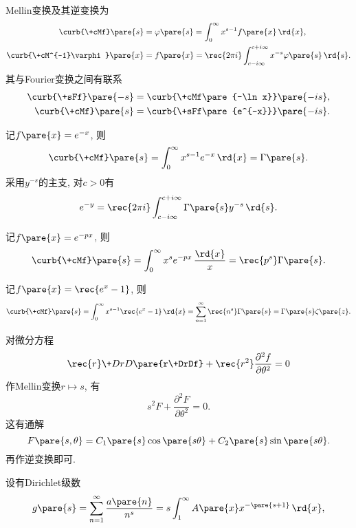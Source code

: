 \documentclass[../ComplexVariable.tex]{subfiles}
\begin{document}
Mellin变换及其逆变换为
\begin{align*}
    \curb{\+cMf}\pare{s} &= \varphi\pare{s} = \int_0^\infty x^{s-1}f\pare{x}\,\rd{x},\\ \curb{\+cM^{-1}\varphi}\pare{x} &= f\pare{x} = \rec{2\pi i} \int_{c-i\infty}^{c+i\infty} x^{-s}\varphi\pare{s}\,\rd{s}.
\end{align*}
其与Fourier变换之间有联系
\begin{align*}
    \curb{\+sFf}\pare{-s} &= \curb{\+cMf\pare{-\ln x}}\pare{-is}, \\
    \curb{\+cMf}\pare{s} &= \curb{\+sFf\pare{e^{-x}}}\pare{-is}.
\end{align*}
\begin{sample}
    \begin{ex}
        记$f\pare{x} = e^{-x}$, 则
        \[ \curb{\+cMf}\pare{s} = \int_0^\infty x^{s-1}e^{-x}\,\rd{x} = \Gamma\pare{s}. \]
        采用$y^{-s}$的主支, 对$c>0$有
        \[ e^{-y} = \rec{2\pi i} \int_{c-i\infty}^{c+i\infty}\Gamma\pare{s}y^{-s}\,\rd{s}. \]
    \end{ex}
\end{sample}
\begin{sample}
    \begin{ex}
        记$f\pare{x} = e^{-px}$, 则
        \[ \curb{\+cMf}\pare{s} = \int_0^\infty x^se^{-px}\,\frac{\rd{x}}{x} = \rec{p^s}\Gamma\pare{s}. \]
    \end{ex}
\end{sample}
\begin{sample}
    \begin{ex}
        记$\displaystyle f\pare{x} = \rec{e^x-1}$, 则
        \[ \curb{\+cMf}\pare{s} = \int_0^\infty x^{s-1}\rec{e^x-1}\,\rd{x} = \sum_{n=1}^\infty \rec{n^s}\Gamma\pare{s} = \Gamma\pare{s}\zeta\pare{z}. \]
    \end{ex}
\end{sample}
\begin{sample}
    \begin{ex}
        对微分方程
        \[ \rec{r}\+DrD{}\pare{r\+DrDf} + \rec{r^2}\frac{\partial^2 f}{\partial\theta^2} = 0 \]
        作Mellin变换$r\mapsto s$, 有
        \[ s^2F + \frac{\partial^2 F}{\partial\theta^2} = 0. \]
        这有通解
        \[ F\pare{s,\theta} = C_1\pare{s}\cos\pare{s\theta} + C_2\pare{s}\sin\pare{s\theta}. \]
        再作逆变换即可.
    \end{ex}
\end{sample}
设有Dirichlet级数
\[ g\pare{s} = \sum_{n=1}^\infty \frac{a\pare{n}}{n^s} = s\int_1^\infty A\pare{x}x^{-\pare{s+1}}\,\rd{x}, \]
\end{document}
